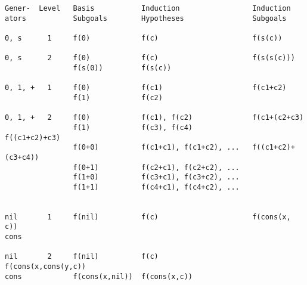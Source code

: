 \begin{verbatim}
Gener-  Level   Basis           Induction                 Induction
ators           Subgoals        Hypotheses                Subgoals

0, s      1     f(0)            f(c)                      f(s(c))

0, s      2     f(0)            f(c)                      f(s(s(c)))
                f(s(0))         f(s(c))

0, 1, +   1     f(0)            f(c1)                     f(c1+c2)
                f(1)            f(c2)

0, 1, +   2     f(0)            f(c1), f(c2)              f(c1+(c2+c3)
                f(1)            f(c3), f(c4)              f((c1+c2)+c3)
                f(0+0)          f(c1+c1), f(c1+c2), ...   f((c1+c2)+(c3+c4))
                f(0+1)          f(c2+c1), f(c2+c2), ...       
                f(1+0)          f(c3+c1), f(c3+c2), ...
                f(1+1)          f(c4+c1), f(c4+c2), ...
                                
                                
nil       1     f(nil)          f(c)                      f(cons(x, c))
cons

nil       2     f(nil)          f(c)                      f(cons(x,cons(y,c))
cons            f(cons(x,nil))  f(cons(x,c))
\end{verbatim}

